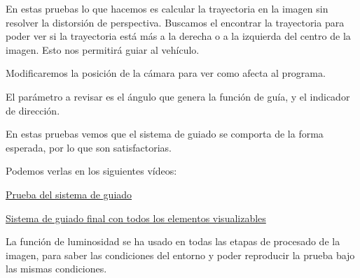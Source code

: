 \begin{itemize}
	En estas pruebas lo que hacemos es calcular la trayectoria en la imagen sin resolver la distorsión de perspectiva. Buscamos el encontrar la trayectoria para poder ver si la trayectoria está más a la derecha o a la izquierda del centro de la imagen. Esto nos permitirá guiar al vehículo. 
	
	Modificaremos la posición de la cámara para ver como afecta al programa.
	
El parámetro a revisar es el ángulo que genera la función de guía, y el indicador de dirección.

En estas pruebas vemos que el sistema de guiado se comporta de la forma esperada, por lo que son satisfactorias.	
	
	Podemos verlas en los siguientes vídeos:
	
	\href{https://youtu.be/ODr3q91MLk0}{Prueba del sistema de guiado}
	
	\href{https://youtu.be/8j69cDydXfA}{Sistema de guiado final con todos los elementos visualizables}
	
	
\end{itemize}

La función de luminosidad se ha usado en todas las etapas de procesado de la imagen, para saber las condiciones del entorno y poder reproducir la prueba bajo las mismas condiciones.
